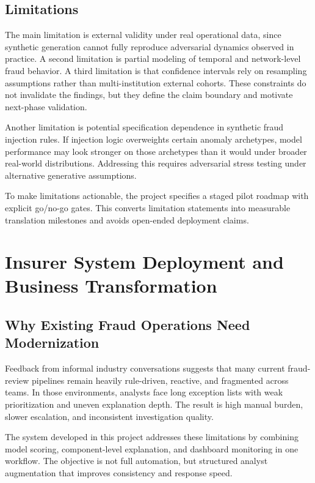 \documentclass[12pt,a4paper]{report}
\begin{document}
\section{Limitations}
The main limitation is external validity under real operational data, since synthetic generation cannot fully reproduce adversarial dynamics observed in practice. A second limitation is partial modeling of temporal and network-level fraud behavior. A third limitation is that confidence intervals rely on resampling assumptions rather than multi-institution external cohorts. These constraints do not invalidate the findings, but they define the claim boundary and motivate next-phase validation.

Another limitation is potential specification dependence in synthetic fraud injection rules. If injection logic overweights certain anomaly archetypes, model performance may look stronger on those archetypes than it would under broader real-world distributions. Addressing this requires adversarial stress testing under alternative generative assumptions.

To make limitations actionable, the project specifies a staged pilot roadmap with explicit go/no-go gates. This converts limitation statements into measurable translation milestones and avoids open-ended deployment claims.

\chapter{Insurer System Deployment and Business Transformation}

\section{Why Existing Fraud Operations Need Modernization}
Feedback from informal industry conversations suggests that many current fraud-review pipelines remain heavily rule-driven, reactive, and fragmented across teams. In those environments, analysts face long exception lists with weak prioritization and uneven explanation depth. The result is high manual burden, slower escalation, and inconsistent investigation quality.

The system developed in this project addresses these limitations by combining model scoring, component-level explanation, and dashboard monitoring in one workflow. The objective is not full automation, but structured analyst augmentation that improves consistency and response speed.
\end{document}

